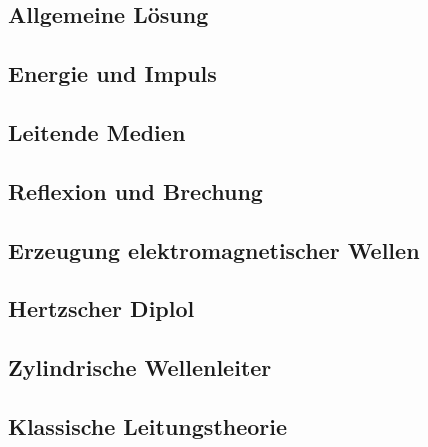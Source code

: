\subsection{Allgemeine Lösung}

\subsection{Energie und Impuls}

\subsection{Leitende Medien}

\subsection{Reflexion und Brechung}

\subsection{Erzeugung elektromagnetischer Wellen}

\subsection{Hertzscher Diplol}

\subsection{Zylindrische Wellenleiter}

\subsection{Klassische Leitungstheorie}


